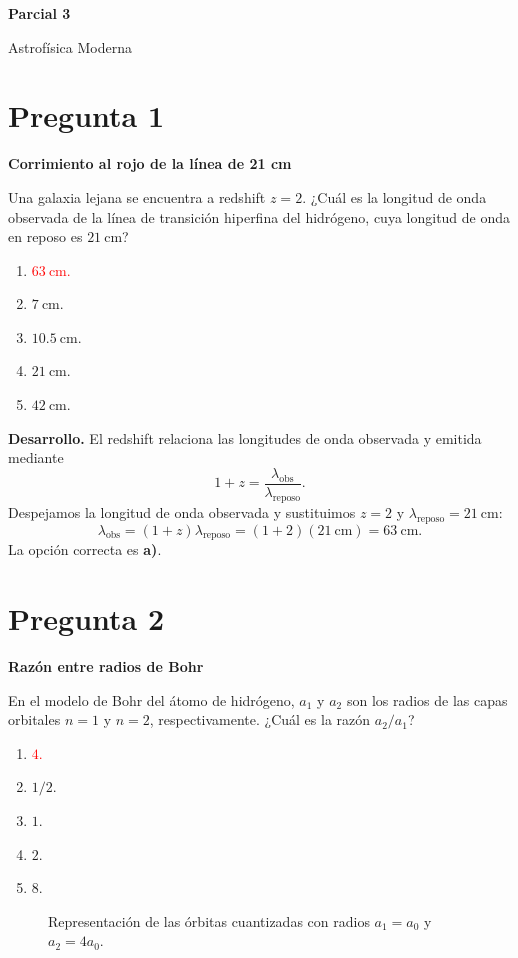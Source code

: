 \documentclass[a4paper,11pt]{article}
\newcommand{\pregunta}[2]{\section*{Pregunta #1}\textbf{#2}\par}
\begin{document}
\begin{center}
    {\LARGE\bfseries Parcial 3\par}
    \medskip
    {\large Astrofísica Moderna\par}
\end{center}

\pregunta{1}{Corrimiento al rojo de la línea de 21 cm}

Una galaxia lejana se encuentra a redshift $z=2$. ¿Cuál es la longitud de onda observada de la línea de transición hiperfina del hidrógeno, cuya longitud de onda en reposo es $21\ \mathrm{cm}$?

\begin{enumerate}
    \item \textcolor{red}{$63\ \mathrm{cm}$.}
    \item $7\ \mathrm{cm}$.
    \item $10.5\ \mathrm{cm}$.
    \item $21\ \mathrm{cm}$.
    \item $42\ \mathrm{cm}$.
\end{enumerate}

\textbf{Desarrollo.} El redshift relaciona las longitudes de onda observada y emitida mediante
\[
1+z=\frac{\lambda_{\mathrm{obs}}}{\lambda_{\mathrm{reposo}}}.
\]
Despejamos la longitud de onda observada y sustituimos $z=2$ y $\lambda_{\mathrm{reposo}}=21\ \mathrm{cm}$:
\[
\lambda_{\mathrm{obs}}=(1+z)\lambda_{\mathrm{reposo}}
=(1+2)(21\ \mathrm{cm})=63\ \mathrm{cm}.
\]
La opción correcta es \textbf{a)}. \parencite[Sec. 4.1.2, pp. 107--108]{chaparro2026}

\pregunta{2}{Razón entre radios de Bohr}

En el modelo de Bohr del átomo de hidrógeno, $a_1$ y $a_2$ son los radios de las capas orbitales $n=1$ y $n=2$, respectivamente. ¿Cuál es la razón $a_2/a_1$?

\begin{enumerate}
    \item \textcolor{red}{$4$.}
    \item $1/2$.
    \item $1$.
    \item $2$.
    \item $8$.
\end{enumerate}

\begin{figure}[H]
\centering

\caption{Representación de las órbitas cuantizadas con radios $a_1=a_0$ y $a_2=4a_0$.}
\end{figure}
\end{document}
